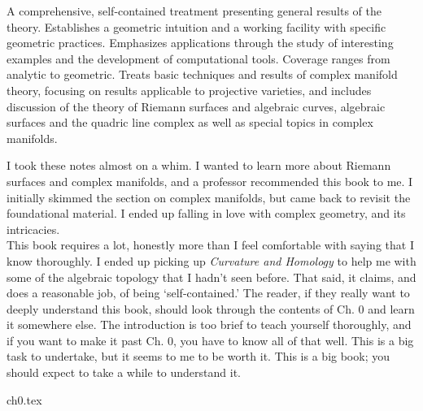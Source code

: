 \documentclass{../booknotes}
\begin{document}
\maketitle

\begin{pubdescrip}
\indent \indent A comprehensive, self-contained treatment presenting general results of the theory. Establishes a geometric intuition and a working facility with specific geometric practices. Emphasizes applications through the study of interesting examples and the development of computational tools. Coverage ranges from analytic to geometric. Treats basic techniques and results of complex manifold theory, focusing on results applicable to projective varieties, and includes discussion of the theory of Riemann surfaces and algebraic curves, algebraic surfaces and the quadric line complex as well as special topics in complex manifolds.
\end{pubdescrip}

\begin{transcribernote}
	\indent  I took these notes almost on a whim. I wanted to learn more about Riemann surfaces and complex manifolds, and a professor recommended this book to me. I initially skimmed the section on complex manifolds, but came back to revisit the foundational material. I ended up falling in love with complex geometry, and its intricacies.\\
	\indent This book requires a lot, honestly more than I feel comfortable with saying that I know thoroughly. I ended up picking up \textit{Curvature and Homology} to help me with some of the algebraic topology that I hadn't seen before. That said, it claims, and does a reasonable job, of being `self-contained.' The reader, if they really want to deeply understand this book, should look through the contents of Ch. 0 and learn it somewhere else. The introduction is too brief to teach yourself thoroughly, and if you want to make it past Ch. 0, you have to know all of that well. This is a big task to undertake, but it seems to me to be worth it. This is a big book; you should expect to take a while to understand it.
\end{transcribernote}

\tableofcontents

{ch0.tex}
\end{document}
